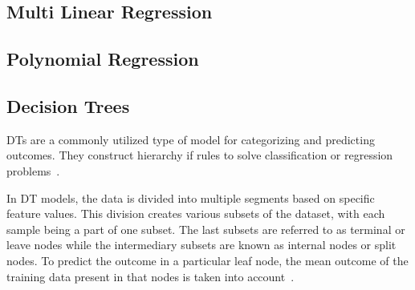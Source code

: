 \subsection{Multi Linear Regression}\label{subsec:multi-linear-regression}

\subsection{Polynomial Regression}\label{subsec:polynomial-regression}

\subsection{Decision Trees}\label{subsec:decision-tree-regression}
\ac{DT}s are a commonly utilized type of model for categorizing and
predicting outcomes.
They construct hierarchy if rules to solve classification or regression
problems~\cite[p.
70]{muller_introductionmachinelearning_2016}.

In \ac{DT} models, the data is divided into multiple segments based on
specific feature values.
This division creates various subsets of the dataset, with each sample being
a part of one subset.
The last subsets are referred to as terminal or leave nodes while the
intermediary subsets are
known as internal nodes or split nodes.
To predict the outcome in a particular leaf node, the mean outcome of the
training data present
in that nodes is taken into account~\cite[p. 76]{molnar2020interpretable}.


